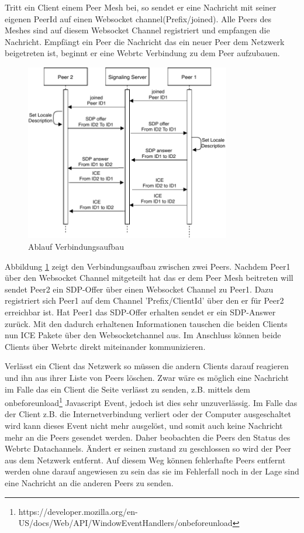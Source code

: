 Tritt ein Client einem Peer Mesh bei, so sendet er eine Nachricht mit seiner eigenen PeerId auf einen Websocket channel({Prefix}/joined). Alle Peers des Meshes sind auf diesem Websocket Channel registriert und empfangen die Nachricht. Empfängt ein Peer die Nachricht das ein neuer Peer dem Netzwerk beigetreten ist, beginnt er eine Webrtc Verbindung zu dem Peer aufzubauen.

\begin{figure}[!h]
	\centering
	\includegraphics[width=0.8\textwidth]{figures/Signaling-Webrtc}
	\caption[A Figure Short-Title]{Ablauf Verbindungsaufbau}
	\label{fig:signaling-connection}
\end{figure}

Abbildung \ref{fig:signaling-connection} zeigt den Verbindungsaufbau zwischen zwei Peers. Nachdem Peer1 über den Websocket Channel mitgeteilt hat das er dem Peer Mesh beitreten will sendet Peer2 ein SDP-Offer über einen Websocket Channel zu Peer1. Dazu registriert sich Peer1 auf dem Channel '{Prefix}/{ClientId}' über den er für Peer2 erreichbar ist. Hat Peer1 das SDP-Offer erhalten sendet er ein SDP-Answer zurück. Mit den dadurch erhaltenen Informationen tauschen die beiden Clients nun ICE Pakete über den Websocketchannel aus. Im Anschluss können beide Clients über Webrtc direkt miteinander kommunizieren. 

Verlässt ein Client das \pTp Netzwerk so müssen die andern Clients darauf reagieren und ihn aus ihrer Liste von Peers löschen. Zwar wäre es möglich eine Nachricht im Falle das ein Client die Seite verlässt zu senden, z.B. mittels dem onbeforeunload\footnote{https://developer.mozilla.org/en-US/docs/Web/API/WindowEventHandlers/onbeforeunload} Javascript Event, jedoch ist dies sehr unzuverlässig. Im Falle das der Client z.B. die Internetverbindung verliert oder der Computer ausgeschaltet wird kann dieses Event nicht mehr ausgelöst, und somit auch keine Nachricht mehr an die Peers gesendet werden. Daher beobachten die Peers den Status des Webrtc Datachannels. Ändert er seinen zustand zu geschlossen so wird der Peer aus dem Netzwerk entfernt. Auf diesem Weg können fehlerhafte Peers entfernt werden ohne darauf angewiesen zu sein das sie im Fehlerfall noch in der Lage sind eine Nachricht an die anderen Peers zu senden.

